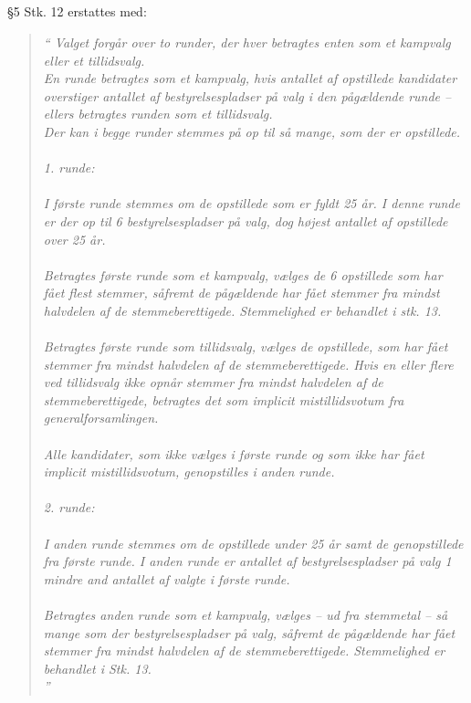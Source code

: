 \documentclass[a4paper,12pt,danish]{article}
\newcommand\cit[1]{
    \begin{quote}
        \textit{``#1''}
    \end{quote}
}
\newcommand\alt[1]{
    \subsection{}
    #1
}
\begin{document}
{    \alt{
        \S5 Stk. 12 erstattes med:
        \cit{
            Valget forgår over to runder, der hver betragtes enten som et kampvalg eller et tillidsvalg.\\
            En runde betragtes som et kampvalg, hvis antallet af opstillede kandidater overstiger antallet af bestyrelsespladser på valg i den pågældende runde – ellers betragtes runden som et tillidsvalg.\\
            Der kan i begge runder stemmes på op til så mange, som der er opstillede.\\
            \\
            1. runde:\\
            \\
            I første runde stemmes om de opstillede som er fyldt 25 år. I denne runde er der op til 6 bestyrelsespladser på valg, dog højest antallet af opstillede over 25 år.\\
            \\
            Betragtes første runde som et kampvalg, vælges de 6 opstillede som har fået flest stemmer, såfremt de pågældende har fået stemmer fra mindst halvdelen af de stemmeberettigede. Stemmelighed er behandlet i stk. 13.\\
            \\
            Betragtes første runde som tillidsvalg, vælges de opstillede, som har fået stemmer fra mindst halvdelen af de stemmeberettigede. Hvis en eller flere ved tillidsvalg ikke opnår stemmer fra mindst halvdelen af de stemmeberettigede, betragtes det som implicit mistillidsvotum fra generalforsamlingen.\\
            \\
            Alle kandidater, som ikke vælges i første runde og som ikke har fået implicit mistillidsvotum, genopstilles i anden runde.\\
            \\
            2. runde:\\
            \\
            I anden runde stemmes om de opstillede under 25 år samt de genopstillede fra første runde. I anden runde er antallet af bestyrelsespladser på valg 1 mindre and antallet af valgte i første runde.\\
            \\
            Betragtes anden runde som et kampvalg, vælges – ud fra stemmetal – så mange som der bestyrelsespladser på valg, såfremt de pågældende har fået stemmer fra mindst halvdelen af de stemmeberettigede. Stemmelighed er behandlet i Stk. 13.\\
}}}
\end{document}
